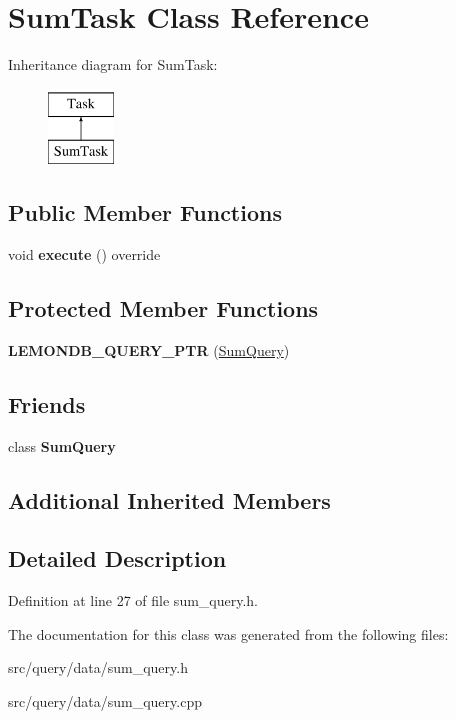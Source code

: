 \hypertarget{class_sum_task}{}\section{Sum\+Task Class Reference}
\label{class_sum_task}
Inheritance diagram for Sum\+Task\+:\begin{figure}[H]
\begin{center}
\leavevmode
\includegraphics[height=2.000000cm]{class_sum_task}
\end{center}
\end{figure}
\subsection*{Public Member Functions}
\begin{DoxyCompactItemize}
\item 
\mbox{\label{class_sum_task_a9a1691dab970d420b7027ff50789d05f}} 
void {\bfseries execute} () override
\end{DoxyCompactItemize}
\subsection*{Protected Member Functions}
\begin{DoxyCompactItemize}
\item 
\mbox{\label{class_sum_task_ae505e938fc04421e69f614c8a81413eb}} 
{\bfseries L\+E\+M\+O\+N\+D\+B\+\_\+\+Q\+U\+E\+R\+Y\+\_\+\+P\+TR} (\hyperlink{class_sum_query}{Sum\+Query})
\end{DoxyCompactItemize}
\subsection*{Friends}
\begin{DoxyCompactItemize}
\item 
\mbox{\label{class_sum_task_ae1e90670d9f36a7b5dd14ff65c070805}} 
class {\bfseries Sum\+Query}
\end{DoxyCompactItemize}
\subsection*{Additional Inherited Members}


\subsection{Detailed Description}


Definition at line 27 of file sum\+\_\+query.\+h.



The documentation for this class was generated from the following files\+:\begin{DoxyCompactItemize}
\item 
src/query/data/sum\+\_\+query.\+h\item 
src/query/data/sum\+\_\+query.\+cpp\end{DoxyCompactItemize}
